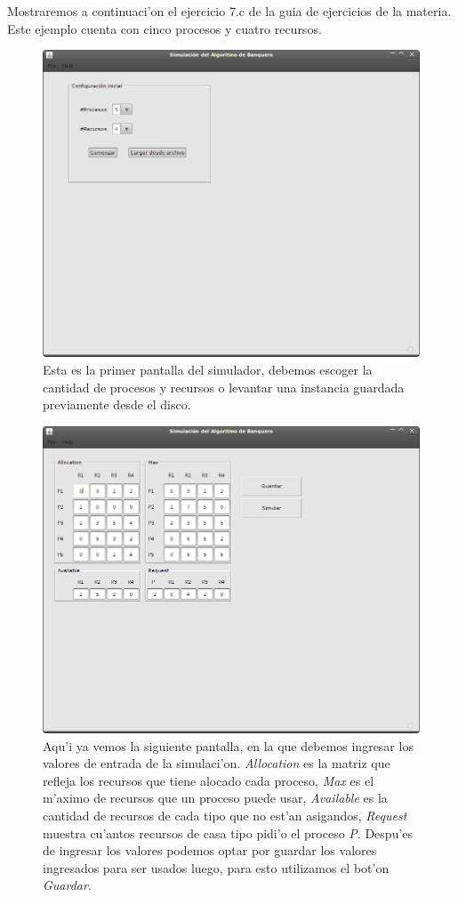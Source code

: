 Mostraremos a continuaci'on el ejercicio 7.c de la guia de ejercicios de la materia. Este ejemplo cuenta con cinco procesos y cuatro recursos.
\begin{figure}
\centering
 \includegraphics[scale=0.4,keepaspectratio=true]{./imagenes/banquero/banquero1.png}
 \caption{Esta es la primer pantalla del simulador, debemos escoger la cantidad de procesos y recursos o levantar una instancia guardada previamente desde el disco.}
\end{figure}
\begin{figure}
\centering
 \includegraphics[scale=0.4,keepaspectratio=true]{./imagenes/banquero/banquero2.png}
 \caption{Aqu'i ya vemos la siguiente pantalla, en la que debemos ingresar los valores de entrada de la simulaci'on. \emph{Allocation} es la matriz que refleja los recursos que tiene alocado cada proceso, \emph{Max} es el m'aximo de recursos que un proceso puede usar, \emph{Available} es la cantidad de recursos de cada tipo que no est'an asigandos, \emph{Request} muestra cu'antos recursos de casa tipo pidi'o el proceso \emph{P}. Despu'es de ingresar los valores podemos optar por guardar los valores ingresados para ser usados luego, para esto utilizamos el bot'on \emph{Guardar}.}
\end{figure}
